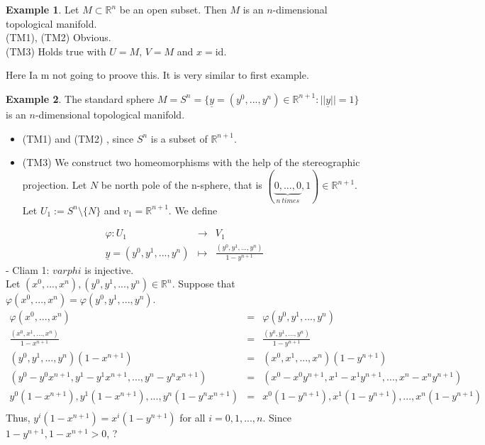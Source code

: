 \documentclass[
]{book}
\providecommand{\tightlist}{%
  \setlength{\itemsep}{0pt}\setlength{\parskip}{0pt}}
\theoremstyle{definition}
\theoremstyle{definition}
\newtheorem{example}{Example}[chapter]
\theoremstyle{definition}
\theoremstyle{definition}
\theoremstyle{remark}
\begin{document}
\begin{example}
\protect\hypertarget{exm:unnamed-chunk-9}{}\label{exm:unnamed-chunk-9}Let \(M \subset \mathbb{R}^n\) be an open subset. Then \(M\) is an \(n\)-dimensional topological manifold.\\
(TM1), (TM2) Obvious.\\
(TM3) Holds true with \(U = M\), \(V = M\) and \(x = \text{id}\).

Here Ia m not going to proove this. It is very similar to first example.
\end{example}

\begin{example}
\protect\hypertarget{exm:unnamed-chunk-10}{}\label{exm:unnamed-chunk-10}The standard sphere \(M = S^n = \{ \underline{y}=(y^0,...,y^{n}) \in \mathbb{R}^{n+1} : ||\underline{y}|| = 1 \}\) is an \(n\)-dimensional topological manifold.

\begin{itemize}
\tightlist
\item
  (TM1) and (TM2) , since \(S^n\) is a subset of \(\mathbb{R}^{n+1}\).
\item
  (TM3) We construct two homeomorphisms with the help of the stereographic projection. Let \(N\) be north pole of the n-sphere, that is \((\underbrace{0,...,0}_{n~times},1)\in \mathbb{R}^{n+1}\). Let \(U_1:=S^n\setminus \{N\}\) and \(v_1=\mathbb{R}^{n+1}\). We define
\end{itemize}

\begin{eqnarray}
\varphi:U_1&\to & V_1\\
\underline{y} =(y^0,y^1,...,y^n) & \mapsto & \frac{(y^0,y^1,...,y^n)}{1-y^{n+1}}
\end{eqnarray}
- Cliam 1: \(varphi\) is injective.\\
Let \((x^0,...,x^{n}),(y^0,y^1,...,y^n)\in \mathbb{R}^n\). Suppose that \(\varphi(x^0,...,x^{n})=\varphi(y^0,y^1,...,y^n)\).
\begin{eqnarray}
\varphi(x^0,...,x^{n})&=&\varphi(y^0,y^1,...,y^n)\\
\frac{(x^0,x^1,...,x^n)}{1-x^{n+1}}&=&\frac{(y^0,y^1,...,y^n)}{1-y^{n+1}}\\
(y^0, y^1, ..., y^n)(1-x^{n+1}) &=& (x^0, x^1, ..., x^n)(1-y^{n+1})\\
(y^0 - y^0x^{n+1}, y^1 - y^1x^{n+1}, ..., y^n - y^nx^{n+1}) &=& (x^0 - x^0y^{n+1}, x^1 - x^1y^{n+1}, ..., x^n - x^ny^{n+1})\\
y^0(1 - x^{n+1}), y^1(1 - x^{n+1}), ..., y^n (1- y^nx^{n+1}) &=&  x^0(1-y^{n+1}), x^1(1 - y^{n+1}), ..., x^n (1- y^{n+1})\\
\end{eqnarray}
Thus, \(y^i(1 - x^{n+1}) = x^i(1 -y^{n+1})\) for all \(i = 0, 1, ..., n\).
Since \(1 - y^{n+1}, 1 - x^{n+1} > 0\),
?


\end{example}
\end{document}
